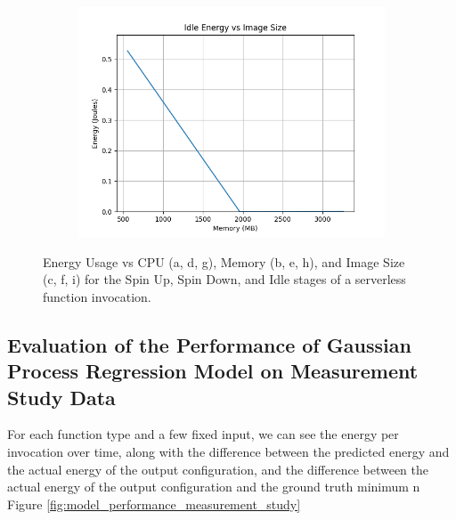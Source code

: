 \documentclass[times, 10pt,twocolumn]{article}
\begin{document}
\begin{figure}[ht]
\begin{subfigure}[b]{0.3\textwidth}
      \includegraphics[width=\textwidth]{imgs/container_study/idle_vs_img.png}
     \caption{}
     \label{fig:idle_img}
   \end{subfigure}
   
   \caption{Energy Usage vs CPU (a, d, g), Memory (b, e, h), and Image Size (c, f, i) for the Spin Up, Spin Down, and Idle stages of a serverless function invocation.}
   \label{fig:energy_stages}
 \end{figure}


 
 \subsection{Evaluation of the Performance of Gaussian Process Regression Model on Measurement Study Data }
 \label{appendix:regression_model_measurement_study}

 For each function type and a few fixed input, we can see the energy per invocation over time, along with the difference between the predicted energy and the actual energy of the output configuration, and the difference between the actual energy of the output configuration and the ground truth minimum n Figure \ref{fig:model_performance_measurement_study}
\end{document}

